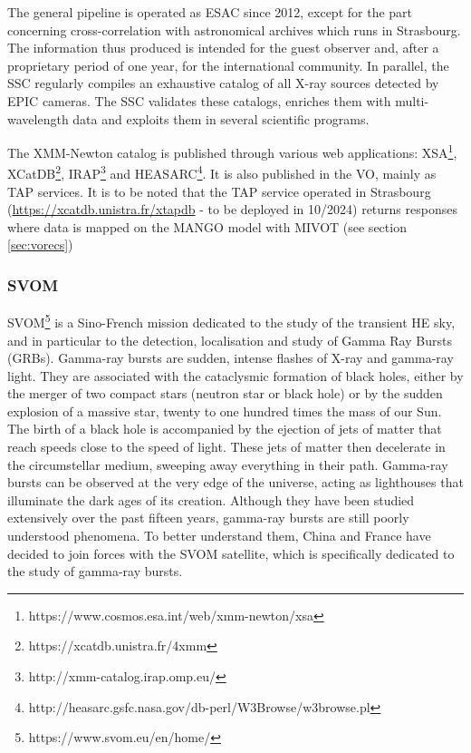 \documentclass[11pt,a4paper]{ivoa}
\begin{document}
The general pipeline is operated as \gls{ESAC} since 2012, except for the part concerning cross-correlation
with astronomical archives which runs in Strasbourg.
The information thus produced is intended for the guest observer and, after a proprietary period of one year,
for the international community.
In parallel, the \gls{SSC} regularly compiles an exhaustive catalog of all X-ray sources detected by \gls{EPIC} cameras.
The \gls{SSC} validates these catalogs, enriches them with multi-wavelength data and exploits them in several scientific programs.

The \gls{XMM-Newton} catalog is published through various web applications: XSA\footnote{https://www.cosmos.esa.int/web/xmm-newton/xsa},
XCatDB\footnote{https://xcatdb.unistra.fr/4xmm}, IRAP\footnote{http://xmm-catalog.irap.omp.eu/} and
HEASARC\footnote{http://heasarc.gsfc.nasa.gov/db-perl/W3Browse/w3browse.pl}.
It is also published in the \gls{VO}, mainly as \gls{TAP} services.
It is to be noted that the \gls{TAP} service operated in Strasbourg (\url{https://xcatdb.unistra.fr/xtapdb} - to be deployed in 10/2024) returns responses where data is mapped on the MANGO model with MIVOT (see section \ref{sec:vorecs})



\subsubsection{SVOM}

\gls{SVOM}\footnote{https://www.svom.eu/en/home/}
is a Sino-French mission dedicated
to the study of the transient \gls{HE} sky, and in particular to the detection, localisation and
study of Gamma Ray Bursts (GRBs).
Gamma-ray bursts are sudden, intense flashes of X-ray and gamma-ray light.
They are associated with the cataclysmic formation of black holes, either by the merger of two compact stars
(neutron star or black hole) or by the sudden explosion of a massive star, twenty to one hundred times the mass of our Sun.
The birth of a black hole is accompanied by the ejection of jets of matter that reach speeds close to the speed of light.
These jets of matter then decelerate in the circumstellar medium, sweeping away everything in their path.
Gamma-ray bursts can be observed at the very edge of the universe, acting as lighthouses that illuminate
the dark ages of its creation. Although they have been studied extensively over the past fifteen years,
gamma-ray bursts are still poorly understood phenomena. To better understand them, China and France have decided
to join forces with the \gls{SVOM} satellite, which is specifically dedicated to the study of gamma-ray bursts.
\end{document}
